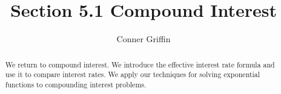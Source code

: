 \documentclass{ximera}
\title{Section 5.1 Compound Interest}
\author{Conner Griffin}
\begin{document}
\begin{abstract}
    We return to compound interest. We introduce the effective interest rate formula and use it to compare interest rates. We apply our techniques for solving exponential functions to compounding interest problems.
\end{abstract}
\maketitle





\end{document}
